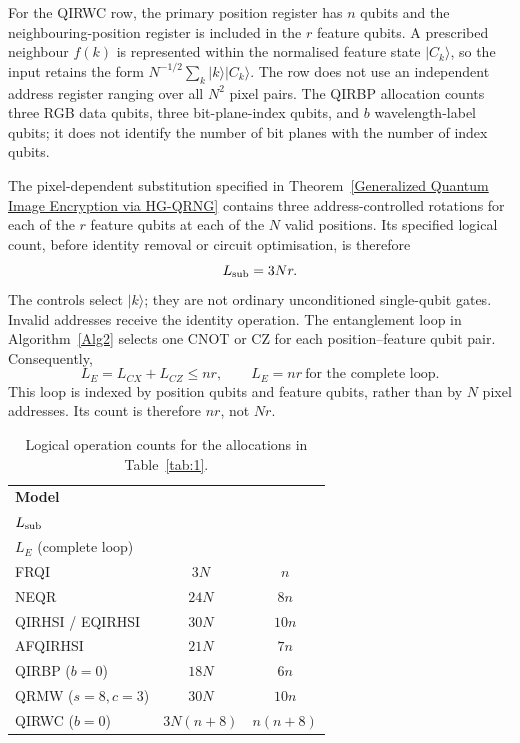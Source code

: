 {For the QIRWC row, the primary position register has $n$ qubits and
the neighbouring-position register is included in the $r$ feature
qubits. A prescribed neighbour $f(k)$ is represented within the
normalised feature state $|C_k\rangle$, so the input retains the form
$N^{-1/2}\sum_k|k\rangle|C_k\rangle$. The row does not use an
independent address register ranging over all $N^2$ pixel pairs. The
QIRBP allocation counts three RGB data qubits, three bit-plane-index
qubits, and $b$ wavelength-label qubits; it does not identify the number
of bit planes with the number of index qubits.

The pixel-dependent substitution specified in
Theorem~\ref{Generalized Quantum Image Encryption via HG-QRNG} contains
three address-controlled rotations for each of the $r$ feature qubits
at each of the $N$ valid positions. Its specified logical count, before
identity removal or circuit optimisation, is therefore
\begin{equation}
L_{\rm sub}=3Nr.
\label{eq:qef-logical-sub-count}
\end{equation}
The controls select $|k\rangle$; they are not ordinary unconditioned
single-qubit gates. Invalid addresses receive the identity operation.
The entanglement loop in Algorithm~\ref{Alg2} selects one CNOT or CZ
for each position--feature qubit pair. Consequently,
\begin{equation}
L_E=L_{CX}+L_{CZ}\le nr,
\qquad L_E=nr\ \text{for the complete loop}.
\label{eq:qef-logical-ent-count}
\end{equation}
This loop is indexed by position qubits and feature qubits, rather than
by $N$ pixel addresses. Its count is therefore $nr$, not $Nr$.

\begin{table}[htbp]
\centering
\color{red}
\caption{{\color{red}Logical operation counts for the allocations in Table~\ref{tab:1}.}}
\label{tab:QGC}
\small
\renewcommand{\arraystretch}{1.12}
\begin{tabular}{|l|c|c|}
\hline
\rowcolor{Bisque3}
\textbf{Model} & \shortstack{\textbf{Controlled rotations}\\$L_{\rm sub}$}
& \shortstack{\textbf{Entangling gates}\\$L_E$ (complete loop)} \\
\hline
FRQI & $3N$ & $n$ \\\hline
NEQR & $24N$ & $8n$ \\\hline
QIRHSI / EQIRHSI & $30N$ & $10n$ \\\hline
AFQIRHSI & $21N$ & $7n$ \\\hline
QIRBP ($b=0$) & $18N$ & $6n$ \\\hline
QRMW ($s=8,c=3$) & $30N$ & $10n$ \\\hline
QIRWC ($b=0$) & $3N(n+8)$ & $n(n+8)$ \\\hline
\end{tabular}
\end{table}

}
